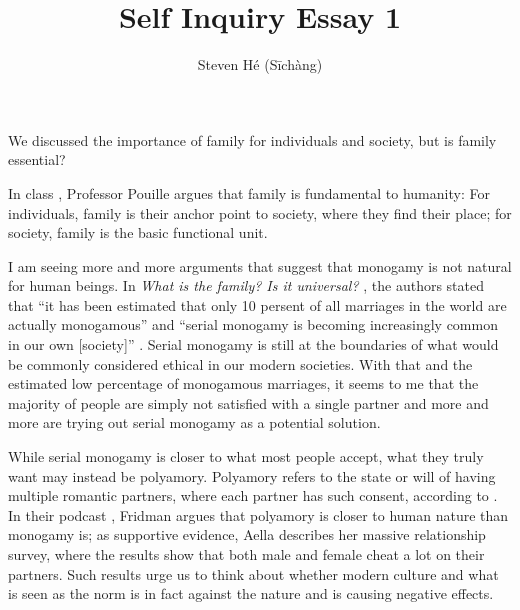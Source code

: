 \documentclass[12pt]{article}
\title{Self Inquiry Essay 1}
\author{Steven Hé (Sīchàng)}
\begin{document}
\maketitle
We discussed the importance of family for individuals and society,
but is family essential?

In class \autocite{pouille2023ethics},
Professor Pouille argues that family is fundamental to humanity:
For individuals, family is their anchor point to society,
where they find their place;
for society, family is the basic functional unit.

I am seeing more and more arguments that suggest that monogamy is not natural
for human beings.
In \textit{What is the family? Is it universal?} \autocite{gittins1993family},
the authors stated that ``it has been estimated that only 10 persent of all
marriages in the world are actually monogamous'' and
``serial monogamy is becoming increasingly common in our own [society]''
\autocite{gittins1993family}.
Serial monogamy is still at the boundaries of what would be commonly considered
ethical in our modern societies.
With that and the estimated low percentage of monogamous marriages,
it seems to me that the majority of people are simply not satisfied with a
single partner and
more and more are trying out serial monogamy as a potential solution.

While serial monogamy is closer to what most people accept,
what they truly want may instead be polyamory.
Polyamory refers to the state or will of having multiple romantic partners,
where each partner has such consent, according to \autocite{wikipedia2023polyamory}.
In their podcast \autocite{fridman2023aella},
Fridman argues that polyamory is closer to human nature than monogamy is;
as supportive evidence, Aella describes her massive relationship survey,
where the results show that both male and female cheat a lot on their partners.
Such results urge us to think about whether modern culture and what is seen as
the norm is in fact against the nature and is causing negative effects.
\pagebreak
\printbibliography
\end{document}
